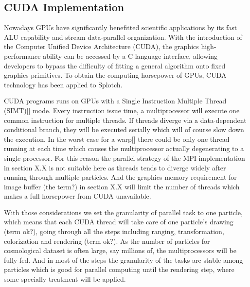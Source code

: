 \subsection{CUDA Implementation}
\label{cuda}
Nowadays GPUs have significantly benefitted scientific applications by its fast ALU capability and stream data-parallel organization. With the introduction of the Computer Unified Device Architecture (CUDA), the graphics high-performance ability can be accessed by a C language interface, allowing developers to bypass the difficulty of fitting a general algorithm onto fixed graphics primitives. To obtain the computing horsepower of GPUs, CUDA technology has been applied to Splotch.

CUDA programs runs on GPUs with a Single Instruction Multiple Thread (SIMT)[] mode. Every instruction issue time, a multiprocessor will execute one common instruction for multiple threads. If threads diverge via a data-dependent conditional branch, they will be executed serially which will of course slow down the execution. In the worst case for a warp[] there could be only one thread running at each time which causes the multiprocessor actually degenerating to a single-processor. For this reason the parallel strategy of the MPI implementation in section X.X is not suitable here as threads tends to diverge widely after running through multiple particles. And the graphics memory requirement for image buffer (the term?) in section X.X will limit the number of threads which makes a full horsepower from CUDA unavailable.

With those considerations we set the granularity of parallel task to one particle, which means that each CUDA thread will take care of one particle's drawing (term ok?), going through all the steps including ranging, transformation, colorization and rendering (term ok?). As the number of particles for cosmological dataset is often large, say millions of, the multiprocessors will be fully fed. And in most of the steps the granularity of the tasks are stable among particles which is good for parallel computing until the rendering step, where some specially treatment will be applied.

